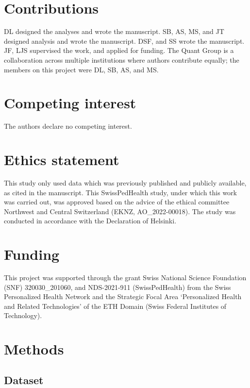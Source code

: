 \section*{Contributions}
\noindent 
DL designed the analyses and wrote the manuscript.
SB, AS, MS, and JT designed analysis and wrote the manuscript.
DSF, and SS wrote the manuscript.
JF, LJS supervised the work, and applied for funding.
The Quant Group is a collaboration across multiple institutions where authors contribute equally; the members on this project were DL, SB, AS, and MS.

\section*{Competing interest}
\noindent
The authors declare no competing interest. 

\section*{Ethics statement}
\noindent
This study only used data which was previously published and publicly available, as cited in the manuscript.
This  SwissPedHealth study, under which this work was carried out, was approved based on the advice of the ethical committee Northwest and Central Switzerland (EKNZ, AO\_2022-00018). 
The study was conducted in accordance with the Declaration of Helsinki.

\section*{Funding}
\noindent This project was supported through the grant Swiss National Science Foundation (SNF) 320030\_201060, and NDS-2021-911 (SwissPedHealth) from the Swiss Personalized Health Network and the Strategic Focal Area `Personalized Health and Related Technologies' of the ETH Domain (Swiss Federal Institutes of Technology).

\clearpage

\section{Methods}
\subsection{Dataset}

